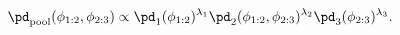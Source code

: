 \begin{equation}
  \pd_{\text{pool}} (\phi_{1:2}, \phi_{2:3}) \propto
  \pd_{1}(\phi_{1:2})^{\lambda_{1}} 
  \pd_{2}(\phi_{1:2}, \phi_{2:3})^{\lambda_{2}}
  \pd_{3}(\phi_{2:3})^{\lambda_{3}}.
  \label{eqn:pooled-prior-overall}
\end{equation}